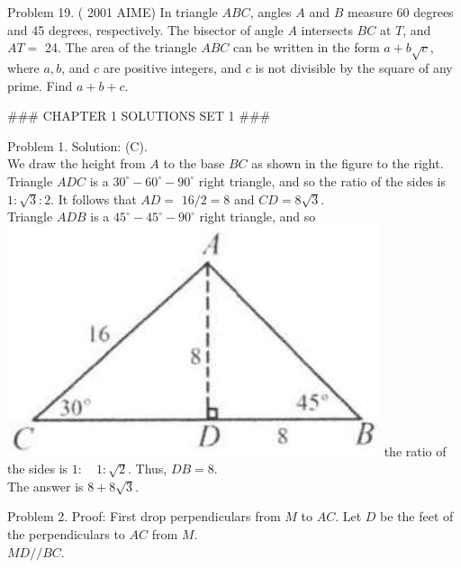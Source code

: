 \documentclass[10pt]{article}
\begin{document}
Problem 19. ( 2001 AIME) In triangle \(A B C\), angles \(A\) and \(B\) measure 60 degrees and 45 degrees, respectively. The bisector of angle \(A\) intersects \(B C\) at \(T\), and \(A T=\) 24. The area of the triangle \(A B C\) can be written in the form \(a+b \sqrt{c}\), where \(a, b\), and \(c\) are positive integers, and \(c\) is not divisible by the square of any prime. Find \(a+b+c\).


### CHAPTER 1 SOLUTIONS SET 1 ###

Problem 1. Solution: (C).\\
We draw the height from \(A\) to the base \(B C\) as shown in the figure to the right.\\
Triangle \(A D C\) is a \(30^{\circ}-60^{\circ}-90^{\circ}\) right triangle, and so the ratio of the sides is \(1: \sqrt{3}: 2\). It follows that \(A D=\) \(16 / 2=8\) and \(C D=8 \sqrt{3}\).\\
Triangle \(A D B\) is a \(45^{\circ}-45^{\circ}-90^{\circ}\) right triangle, and so\\
\includegraphics[max width=\textwidth]{2025_04_17_97bc1f7e44d93c271a88g-092} the ratio of the sides is \(1: \quad 1: \sqrt{2}\). Thus, \(D B=8\).\\
The answer is \(8+8 \sqrt{3}\).

Problem 2. Proof:
First drop perpendiculars from \(M\) to \(A C\). Let \(D\) be the feet of the perpendiculars to \(A C\) from \(M\).\\
\(M D / / B C\).
\end{document}
